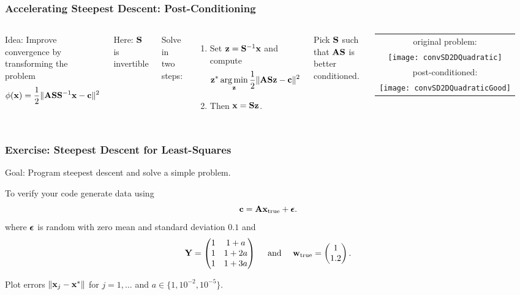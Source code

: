 \documentclass[12pt,fleqn]{beamer}
\begin{document}
\begin{frame}\frametitle{Accelerating Steepest Descent: Post-Conditioning}

\begin{columns}
	
	Idea: Improve convergence by transforming the problem
	 $$ \phi({\bf x}) = {\frac 12} \|{\bf A} {\bf S} {\bf S}^{-1}{\bf x} - {\bf c} \|^2$$
	
	Here: ${\bf S}$ is invertible

	Solve in two steps:
	\begin{enumerate}
		\item Set ${\bf z} = {\bf S}^{-1}{\bf x}$ and compute
	 $$ {\bf z}^* \operatorname*{arg\,min}_{{\bf z}} {\frac 12} \|{\bf A} {\bf S} {\bf z} - {\bf c} \|^2$$
	 	\item Then ${\bf x} = {\bf S} {\bf z}$.
	\end{enumerate} 

	 \bigskip

	 Pick ${\bf S}$ such that ${\bf A} {\bf S}$ is better conditioned.

	\pause
	\begin{tabular}{@{}c@{}}
		original problem: \\
		\texttt{[image: convSD2DQuadratic]}\\
		post-conditioned:\\
		\texttt{[image: convSD2DQuadraticGood]} \\
	\end{tabular}
\end{columns}

\end{frame}



\begin{frame}\frametitle{Exercise: Steepest Descent for Least-Squares}

Goal: Program steepest descent and solve a simple problem.

\bigskip

To verify your code generate data using
$$ {\bf c} = {\bf A} {\bf x}_{\rm true} + {\boldsymbol \epsilon}. $$
where ${\boldsymbol \epsilon}$ is random with zero mean and standard deviation $0.1$ and
$$
 {\bf Y} = \begin{pmatrix}  1 & 1+a \\ 1 & 1+2a \\ 1 & 1+3a
	\end{pmatrix} 
	\quad  \text{ and } \quad
	 {\bf w}_{\rm true} = \begin{pmatrix} 1\\ 1.2 \end{pmatrix}.
$$

\bigskip

Plot errors $\|{\bf x}_j - {\bf x}^*\|$ for $j=1,\dots$ and $a \in \{1, 10^{-2}, 10^{-5}\}$.

\end{frame}
\end{document}
